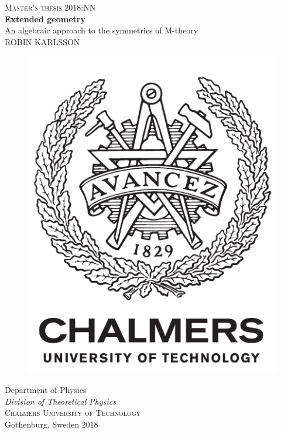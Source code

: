 \newpage
\thispagestyle{empty}
\begin{center}
	\textsc{\large Master's thesis 2018:NN}\\[4cm]		%
	\textbf{{\Huge 	Extended geometry}} 	\\[1cm]
	{\large An algebraic approach to the symmetries of M-theory}\\[1cm]
	{\large ROBIN KARLSSON}
	
	\vfill	
	\begin{figure}[H]
	\centering
	\includegraphics[width=0.2\pdfpagewidth]{figure/auxiliary/logo_eng.pdf} \\	
	\end{figure}	\vspace{5mm}	
	
	Department of Physics \\
	\emph{Division of Theoretical Physics}\\
	\textsc{Chalmers University of Technology} \\
	Gothenburg, Sweden 2018 \\
\end{center}


